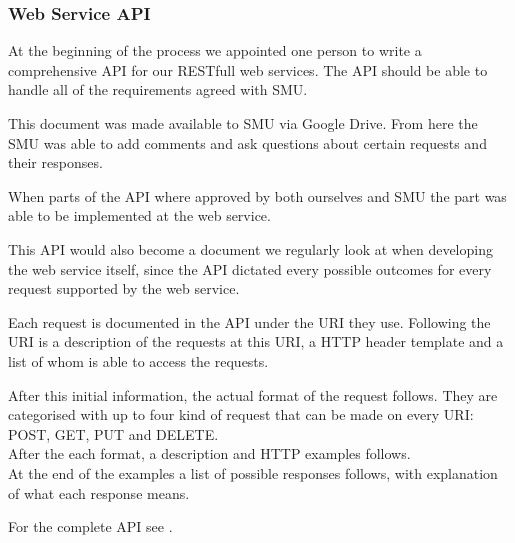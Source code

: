 \subsubsection{Web Service API}
At the beginning of the process we appointed one person to write a comprehensive API for our RESTfull web services.
The API should be able to handle all of the requirements agreed with SMU.

This document was made available to SMU via Google Drive. From here the SMU was able to add comments and ask questions about certain requests and their responses.

When parts of the API where approved by both ourselves and SMU the part was able to be implemented at the web service.

This API would also become a document we regularly look at when developing the web service itself, since the API dictated every possible outcomes for every request supported by the web service.

Each request is documented in the API under the URI they use. Following the URI is a description of the requests at this URI, a HTTP header template and a list of whom is able to access the requests.

After this initial information, the actual format of the request follows. They are categorised with up to four kind of request that can be made on every URI: POST, GET, PUT and DELETE. \\
After the each format, a description and HTTP examples follows. \\
At the end of the examples a list of possible responses follows, with explanation of what each response means.

For the complete API see .